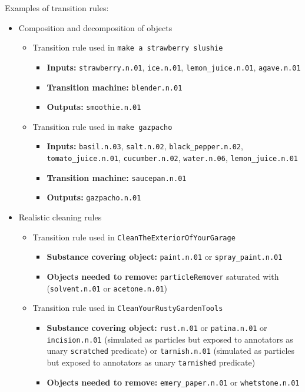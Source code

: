 Examples of transition rules: 
\vspace{-2mm}
\begin{itemize}[leftmargin=2em]
    \item Composition and decomposition of objects 
    \begin{itemize}
        \item Transition rule used in \texttt{make a strawberry slushie}
        \begin{itemize}
            \item \textbf{Inputs:} \texttt{strawberry.n.01}, \texttt{ice.n.01}, \texttt{lemon\_juice.n.01}, \texttt{agave.n.01}
            \item \textbf{Transition machine:} \texttt{blender.n.01}
            \item \textbf{Outputs:} \texttt{smoothie.n.01}
        \end{itemize}
        \item Transition rule used in \texttt{make gazpacho}
        \begin{itemize}
            \item \textbf{Inputs:} \texttt{basil.n.03}, \texttt{salt.n.02}, \texttt{black\_pepper.n.02}, \texttt{tomato\_juice.n.01}, \texttt{cucumber.n.02}, \texttt{water.n.06}, \texttt{lemon\_juice.n.01}
            \item \textbf{Transition machine:} \texttt{saucepan.n.01}
            \item \textbf{Outputs:} \texttt{gazpacho.n.01}
        \end{itemize}
    \end{itemize}
    \item Realistic cleaning rules
    \begin{itemize}
    \item Transition rule used in \texttt{CleanTheExteriorOfYourGarage}
    \begin{itemize}
        \item \textbf{Substance covering object:} \texttt{paint.n.01} or \texttt{spray\_paint.n.01}
        \item \textbf{Objects needed to remove:} \texttt{particleRemover} saturated with (\texttt{solvent.n.01} or \texttt{acetone.n.01})
    \end{itemize}
    \item Transition rule used in \texttt{CleanYourRustyGardenTools}
    \begin{itemize}
        \item \textbf{Substance covering object:} \texttt{rust.n.01} or \texttt{patina.n.01} or \texttt{incision.n.01} (simulated as particles but exposed to annotators as unary \texttt{scratched} predicate) or \texttt{tarnish.n.01} (simulated as particles but exposed to annotators as unary \texttt{tarnished} predicate)
        \item \textbf{Objects needed to remove:} \texttt{emery\_paper.n.01} or \texttt{whetstone.n.01}
    \end{itemize}
    \end{itemize}
\end{itemize}

